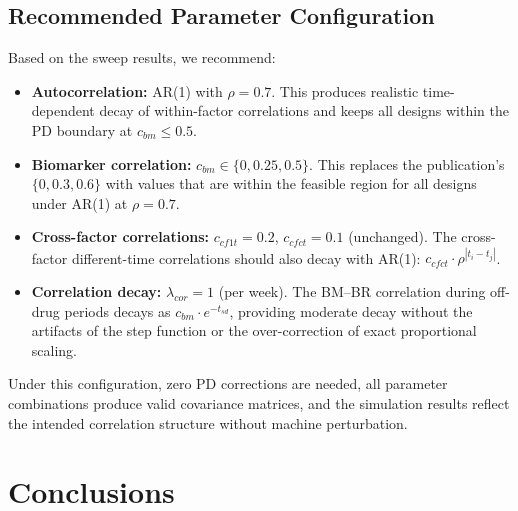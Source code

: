 \documentclass[11pt]{article}
\begin{document}
\subsection{Recommended Parameter Configuration}

Based on the sweep results, we recommend:

\begin{itemize}
\item \textbf{Autocorrelation:} AR(1) with $\rho = 0.7$.
  This produces realistic time-dependent decay of
  within-factor correlations and keeps all designs within
  the PD boundary at $c_{bm} \leq 0.5$.

\item \textbf{Biomarker correlation:}
  $c_{bm} \in \{0, 0.25, 0.5\}$. This replaces the
  publication's $\{0, 0.3, 0.6\}$ with values that are
  within the feasible region for all designs under AR(1)
  at $\rho = 0.7$.

\item \textbf{Cross-factor correlations:}
  $c_{cf1t} = 0.2$, $c_{cfct} = 0.1$ (unchanged). The
  cross-factor different-time correlations should also
  decay with AR(1): $c_{cfct} \cdot \rho^{|t_i - t_j|}$.

\item \textbf{Correlation decay:}
  $\lambda_{cor} = 1$ (per week). The BM--BR correlation
  during off-drug periods decays as
  $c_{bm} \cdot e^{-t_{sd}}$, providing moderate decay
  without the artifacts of the step function or the
  over-correction of exact proportional scaling.
\end{itemize}

Under this configuration, zero PD corrections are needed,
all parameter combinations produce valid covariance matrices,
and the simulation results reflect the intended correlation
structure without machine perturbation.

\section{Conclusions}
\end{document}

